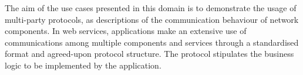 

 



The aim of the use cases presented in this domain is to
demonstrate the usage of multi-party protocols, as descriptions of
the communication behaviour of network components.
In web services, applications make an extensive use
of communications among multiple components and services
through a standardised format and agreed-upon protocol structure.
The protocol stipulates the business logic to
be implemented by the application.

